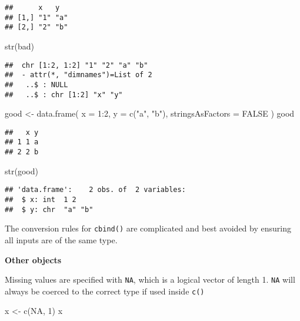 \documentclass[
]{book}
\newenvironment{Shaded}{\begin{snugshade}}{\end{snugshade}}
\newcommand{\AttributeTok}[1]{\textcolor[rgb]{0.77,0.63,0.00}{#1}}
\newcommand{\ConstantTok}[1]{\textcolor[rgb]{0.00,0.00,0.00}{#1}}
\newcommand{\DecValTok}[1]{\textcolor[rgb]{0.00,0.00,0.81}{#1}}
\newcommand{\FunctionTok}[1]{\textcolor[rgb]{0.00,0.00,0.00}{#1}}
\newcommand{\NormalTok}[1]{#1}
\newcommand{\OtherTok}[1]{\textcolor[rgb]{0.56,0.35,0.01}{#1}}
\newcommand{\SpecialCharTok}[1]{\textcolor[rgb]{0.00,0.00,0.00}{#1}}
\newcommand{\StringTok}[1]{\textcolor[rgb]{0.31,0.60,0.02}{#1}}
\begin{document}
\begin{verbatim}
##      x   y  
## [1,] "1" "a"
## [2,] "2" "b"
\end{verbatim}

\begin{Shaded}
\begin{Highlighting}[]
\FunctionTok{str}\NormalTok{(bad)}
\end{Highlighting}
\end{Shaded}

\begin{verbatim}
##  chr [1:2, 1:2] "1" "2" "a" "b"
##  - attr(*, "dimnames")=List of 2
##   ..$ : NULL
##   ..$ : chr [1:2] "x" "y"
\end{verbatim}

\begin{Shaded}
\begin{Highlighting}[]
\NormalTok{good }\OtherTok{\textless{}{-}} \FunctionTok{data.frame}\NormalTok{(}
  \AttributeTok{x =} \DecValTok{1}\SpecialCharTok{:}\DecValTok{2}\NormalTok{, }\AttributeTok{y =} \FunctionTok{c}\NormalTok{(}\StringTok{"a"}\NormalTok{, }\StringTok{"b"}\NormalTok{),}
  \AttributeTok{stringsAsFactors =} \ConstantTok{FALSE}
\NormalTok{)}
\NormalTok{good}
\end{Highlighting}
\end{Shaded}

\begin{verbatim}
##   x y
## 1 1 a
## 2 2 b
\end{verbatim}

\begin{Shaded}
\begin{Highlighting}[]
\FunctionTok{str}\NormalTok{(good)}
\end{Highlighting}
\end{Shaded}

\begin{verbatim}
## 'data.frame':    2 obs. of  2 variables:
##  $ x: int  1 2
##  $ y: chr  "a" "b"
\end{verbatim}

The conversion rules for \texttt{cbind()} are complicated and best avoided by ensuring all inputs are of the same type.

\textbf{Other objects}

Missing values are specified with \texttt{NA}, which is a logical vector of length 1. \texttt{NA} will always be coerced to the correct type if used inside \texttt{c()}

\begin{Shaded}
\begin{Highlighting}[]
\NormalTok{x }\OtherTok{\textless{}{-}} \FunctionTok{c}\NormalTok{(}\ConstantTok{NA}\NormalTok{, }\DecValTok{1}\NormalTok{)}
\NormalTok{x}
\end{Highlighting}
\end{Shaded}
\end{document}
